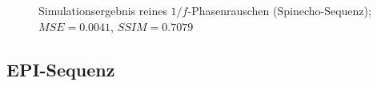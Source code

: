 \begin{figure}[H]
	\centering
	\hfill
	\caption[Simulationsergebnis reines $1/f$-Phasenrauschen (SE) (3)]{Simulationsergebnis reines $1/f$-Phasenrauschen (Spinecho-Sequenz); $MSE=0.0041$, $SSIM=0.7079$}
	\label{fig:res1overFse3}	
\end{figure}

\subsection{EPI-Sequenz}

